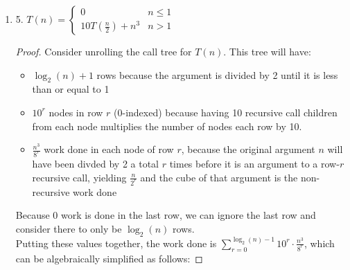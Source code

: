 \documentclass[10pt]{article}
\begin{document}
\begin{enumerate}[label={}]
\begin{proof}
                  Since the total work $n^2 \log _3 n$ is always less than or equal to $n^2 \log _3 n$ for $n \geq 1$, it follows that $T(n)=n^2 \log _3 n \in O\left(n^2 \log _3 n\right)$.

            \end{proof}


            \newpage


      \item 5. $T(n)= \begin{cases}0 & n \leq 1 \\ 10 T\left(\frac{n}{2}\right)+n^3 & n>1\end{cases}$

            \begin{proof}
                  Consider unrolling the call tree for $T(n)$. This tree will have:
                  \begin{itemize}
                        \item $\log _2(n)+1$ rows because the argument is divided by 2 until it is less than or equal to 1
                        \item $10^r$ nodes in row $r$ (0-indexed) because having 10 recursive call children from each node multiplies the number of nodes each row by 10.
                        \item $\frac{n^3}{8^r}$ work done in each node of row $r$, because the original argument $n$ will have been divded by 2 a total $r$ times before it is an argument to a row-$r$ recursive call, yielding $\frac{n}{2^r}$ and the cube of that argument is the non-recursive work done
                  \end{itemize}
                  Because 0 work is done in the last row, we can ignore the last row and consider there to only be $\log _2(n)$ rows.\\
                  Putting these values together, the work done is $\sum_{r=0}^{\log _2(n)-1} 10^r \cdot \frac{n^3}{8^r}$, which can be algebraically simplified as follows:


\end{proof}
\end{enumerate}
\end{document}
